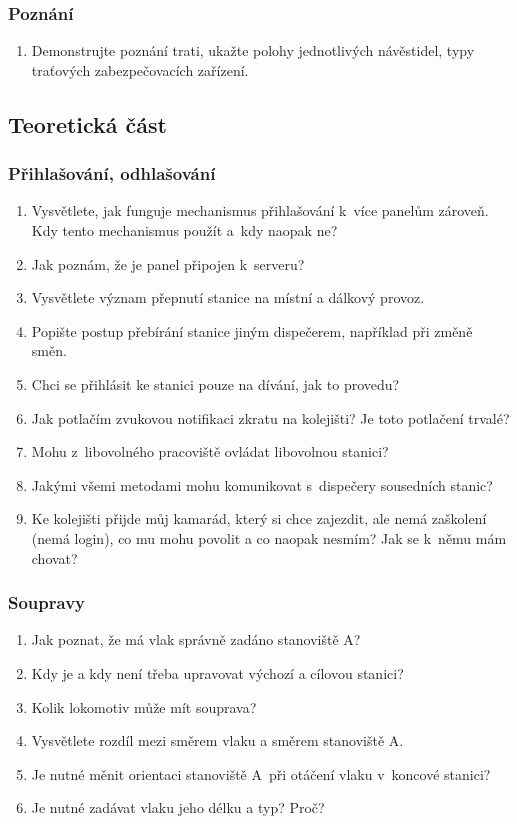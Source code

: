 \documentclass[12pt,a4paper]{article}
\begin{document}
\subsubsection*{Poznání}
\begin{enumerate}[leftmargin=*]
\item Demonstrujte poznání trati, ukažte polohy jednotlivých návěstidel, typy
traťových zabezpečovacích zařízení.
\end{enumerate}


\subsection{Teoretická část}

\subsubsection*{Přihlašování, odhlašování}
\begin{enumerate}[leftmargin=*]
\item Vysvětlete, jak funguje mechanismus přihlašování k~více panelům zároveň.
Kdy tento mechanismus použít a~kdy naopak ne?
\item Jak poznám, že je panel připojen k~serveru?
\item Vysvětlete význam přepnutí stanice na místní a dálkový provoz.
\item Popište postup přebírání stanice jiným dispečerem, například při změně
směn.
\item Chci se přihlásit ke stanici pouze na dívání, jak to provedu?
\item Jak potlačím zvukovou notifikaci zkratu na kolejišti? Je toto potlačení
trvalé?
\item Mohu z~libovolného pracoviště ovládat libovolnou stanici?
\item Jakými všemi metodami mohu komunikovat s~dispečery sousedních stanic?
\item Ke kolejišti přijde můj kamarád, který si chce zajezdit, ale nemá
zaškolení (nemá login), co mu mohu povolit a co naopak nesmím? Jak se k~němu
mám chovat?
\end{enumerate}

\subsubsection*{Soupravy}
\begin{enumerate}[leftmargin=*]
\item Jak poznat, že má vlak správně zadáno stanoviště A?
\item Kdy je a kdy není třeba upravovat výchozí a cílovou stanici?
\item Kolik lokomotiv může mít souprava?
\item Vysvětlete rozdíl mezi směrem vlaku a směrem stanoviště A.
\item Je nutné měnit orientaci stanoviště A~při otáčení vlaku v~koncové
stanici?
\item Je nutné zadávat vlaku jeho délku a typ? Proč?
\end{enumerate}
\end{document}
